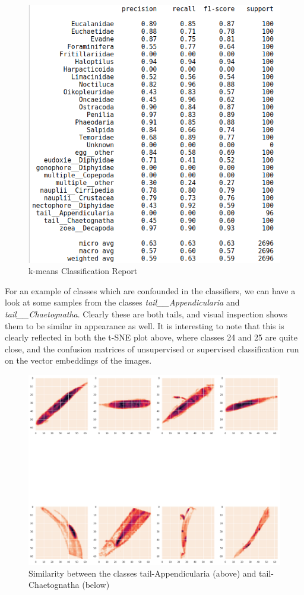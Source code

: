 \documentclass[10pt]{article}
\begin{document}
\begin{figure}
\includegraphics[scale=.55]{kmeans_crep.png}
\caption{k-means Classification Report}
\end{figure}

For an example of classes which are confounded in the classifiers, we can have a look at some samples from the classes \emph{tail\_\_Appendicularia} and \emph{tail\_\_Chaetognatha}. Clearly these are both tails, and visual inspection shows them to be similar in appearance as well. It is interesting to note that this is clearly reflected in both the t-SNE plot above, where classes 24 and 25 are quite close, and the confusion matrices of unsupervised or supervised classification run on the vector embeddings of the images.

\begin{figure}
\includegraphics[scale=.35]{confusion_24_25}
\caption{Similarity between the classes tail-Appendicularia (above) and tail-Chaetognatha (below)}
\end{figure}
\end{document}
